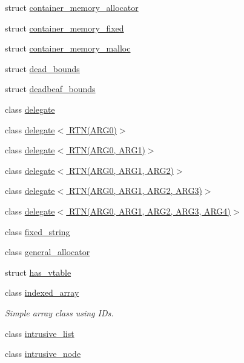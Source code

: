 \begin{DoxyCompactItemize}
\item 
struct \hyperlink{structcrap_1_1container__memory__allocator}{container\+\_\+memory\+\_\+allocator}
\item 
struct \hyperlink{structcrap_1_1container__memory__fixed}{container\+\_\+memory\+\_\+fixed}
\item 
struct \hyperlink{structcrap_1_1container__memory__malloc}{container\+\_\+memory\+\_\+malloc}
\item 
struct \hyperlink{structcrap_1_1dead__bounds}{dead\+\_\+bounds}
\item 
struct \hyperlink{structcrap_1_1deadbeaf__bounds}{deadbeaf\+\_\+bounds}
\item 
class \hyperlink{classcrap_1_1delegate}{delegate}
\item 
class \hyperlink{classcrap_1_1delegate_3_01_r_t_n_07_a_r_g0_08_4}{delegate$<$ R\+T\+N(\+A\+R\+G0)$>$}
\item 
class \hyperlink{classcrap_1_1delegate_3_01_r_t_n_07_a_r_g0_00_01_a_r_g1_08_4}{delegate$<$ R\+T\+N(\+A\+R\+G0, A\+R\+G1)$>$}
\item 
class \hyperlink{classcrap_1_1delegate_3_01_r_t_n_07_a_r_g0_00_01_a_r_g1_00_01_a_r_g2_08_4}{delegate$<$ R\+T\+N(\+A\+R\+G0, A\+R\+G1, A\+R\+G2)$>$}
\item 
class \hyperlink{classcrap_1_1delegate_3_01_r_t_n_07_a_r_g0_00_01_a_r_g1_00_01_a_r_g2_00_01_a_r_g3_08_4}{delegate$<$ R\+T\+N(\+A\+R\+G0, A\+R\+G1, A\+R\+G2, A\+R\+G3)$>$}
\item 
class \hyperlink{classcrap_1_1delegate_3_01_r_t_n_07_a_r_g0_00_01_a_r_g1_00_01_a_r_g2_00_01_a_r_g3_00_01_a_r_g4_08_4}{delegate$<$ R\+T\+N(\+A\+R\+G0, A\+R\+G1, A\+R\+G2, A\+R\+G3, A\+R\+G4)$>$}
\item 
class \hyperlink{classcrap_1_1fixed__string}{fixed\+\_\+string}
\item 
class \hyperlink{classcrap_1_1general__allocator}{general\+\_\+allocator}
\item 
struct \hyperlink{structcrap_1_1has__vtable}{has\+\_\+vtable}
\item 
class \hyperlink{classcrap_1_1indexed__array}{indexed\+\_\+array}
\begin{DoxyCompactList}\small\item\em Simple array class using I\+Ds. \end{DoxyCompactList}\item 
class \hyperlink{singletoncrap_1_1intrusive__list}{intrusive\+\_\+list}
\item 
class \hyperlink{classcrap_1_1intrusive__node}{intrusive\+\_\+node}

\end{DoxyCompactItemize}
